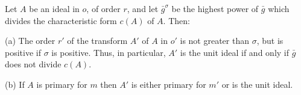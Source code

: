 Let $A$ be an ideal in $o$, of order $r$, and let $\bar{g}^\sigma$ be the highest power of $\bar{g}$ which divides the characteristic form $c(A)$ of $A$. Then:

(a) The order $r'$ of the transform $A'$ of $A$ in $o'$ is not greater than $\sigma$, but is positive if $\sigma$ is positive. Thus, in particular, $A'$ is the unit ideal if and only if $\bar{g}$ does not divide $c(A)$.

(b) If $A$ is primary for $m$ then $A'$ is either primary for $m'$ or is the unit ideal.